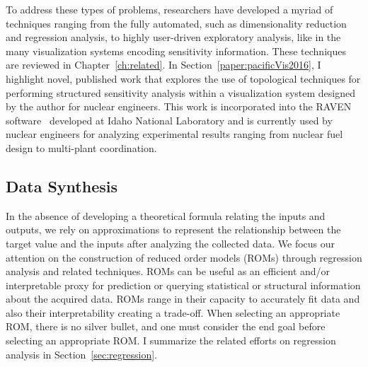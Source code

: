 To address these types of problems, researchers have developed a myriad of techniques ranging from the fully automated, such as dimensionality reduction and regression analysis, to highly user-driven exploratory analysis, like in the many visualization systems encoding sensitivity information.
%
These techniques are reviewed in Chapter~\ref{ch:related}.
%
In Section~\ref{paper:pacificVis2016}, I highlight novel, published work that explores the use of topological techniques for performing structured sensitivity analysis within a visualization system designed by the author for nuclear engineers.
%
This work is incorporated into the RAVEN software~\cite{RabitiAlfonsiCogliati2015} developed at Idaho National Laboratory and is currently used by nuclear engineers for analyzing experimental results ranging from nuclear fuel design to multi-plant coordination.

\subsection{Data Synthesis}

In the absence of developing a theoretical formula relating the inputs and outputs, we rely on approximations to represent the relationship between the target value and the inputs after analyzing the collected data.
%
We focus our attention on the construction of reduced order models (ROMs) through regression analysis and related techniques.
%
ROMs can be useful as an efficient and/or interpretable proxy for prediction or querying statistical or structural information about the acquired data.
%
ROMs range in their capacity to accurately fit data and also their interpretability creating a trade-off.
%
When selecting an appropriate ROM, there is no silver bullet, and one must consider the end goal before selecting an appropriate ROM.
%
I summarize the related efforts on regression analysis in Section~\ref{sec:regression}.


